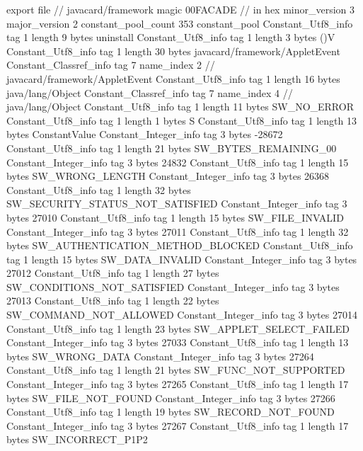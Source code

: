 export file {		// javacard/framework
	magic	00FACADE		 // in hex
	minor_version	3
	major_version	2
	constant_pool_count	353
	constant_pool {
		Constant_Utf8_info {
			tag	1
			length	9
			bytes	uninstall
		}
		Constant_Utf8_info {
			tag	1
			length	3
			bytes	()V
		}
		Constant_Utf8_info {
			tag	1
			length	30
			bytes	javacard/framework/AppletEvent
		}
		Constant_Classref_info {
			tag	7
			name_index	2		// javacard/framework/AppletEvent
		}
		Constant_Utf8_info {
			tag	1
			length	16
			bytes	java/lang/Object
		}
		Constant_Classref_info {
			tag	7
			name_index	4		// java/lang/Object
		}
		Constant_Utf8_info {
			tag	1
			length	11
			bytes	SW_NO_ERROR
		}
		Constant_Utf8_info {
			tag	1
			length	1
			bytes	S
		}
		Constant_Utf8_info {
			tag	1
			length	13
			bytes	ConstantValue
		}
		Constant_Integer_info {
			tag	3
			bytes	-28672
		}
		Constant_Utf8_info {
			tag	1
			length	21
			bytes	SW_BYTES_REMAINING_00
		}
		Constant_Integer_info {
			tag	3
			bytes	24832
		}
		Constant_Utf8_info {
			tag	1
			length	15
			bytes	SW_WRONG_LENGTH
		}
		Constant_Integer_info {
			tag	3
			bytes	26368
		}
		Constant_Utf8_info {
			tag	1
			length	32
			bytes	SW_SECURITY_STATUS_NOT_SATISFIED
		}
		Constant_Integer_info {
			tag	3
			bytes	27010
		}
		Constant_Utf8_info {
			tag	1
			length	15
			bytes	SW_FILE_INVALID
		}
		Constant_Integer_info {
			tag	3
			bytes	27011
		}
		Constant_Utf8_info {
			tag	1
			length	32
			bytes	SW_AUTHENTICATION_METHOD_BLOCKED
		}
		Constant_Utf8_info {
			tag	1
			length	15
			bytes	SW_DATA_INVALID
		}
		Constant_Integer_info {
			tag	3
			bytes	27012
		}
		Constant_Utf8_info {
			tag	1
			length	27
			bytes	SW_CONDITIONS_NOT_SATISFIED
		}
		Constant_Integer_info {
			tag	3
			bytes	27013
		}
		Constant_Utf8_info {
			tag	1
			length	22
			bytes	SW_COMMAND_NOT_ALLOWED
		}
		Constant_Integer_info {
			tag	3
			bytes	27014
		}
		Constant_Utf8_info {
			tag	1
			length	23
			bytes	SW_APPLET_SELECT_FAILED
		}
		Constant_Integer_info {
			tag	3
			bytes	27033
		}
		Constant_Utf8_info {
			tag	1
			length	13
			bytes	SW_WRONG_DATA
		}
		Constant_Integer_info {
			tag	3
			bytes	27264
		}
		Constant_Utf8_info {
			tag	1
			length	21
			bytes	SW_FUNC_NOT_SUPPORTED
		}
		Constant_Integer_info {
			tag	3
			bytes	27265
		}
		Constant_Utf8_info {
			tag	1
			length	17
			bytes	SW_FILE_NOT_FOUND
		}
		Constant_Integer_info {
			tag	3
			bytes	27266
		}
		Constant_Utf8_info {
			tag	1
			length	19
			bytes	SW_RECORD_NOT_FOUND
		}
		Constant_Integer_info {
			tag	3
			bytes	27267
		}
		Constant_Utf8_info {
			tag	1
			length	17
			bytes	SW_INCORRECT_P1P2
}}}
